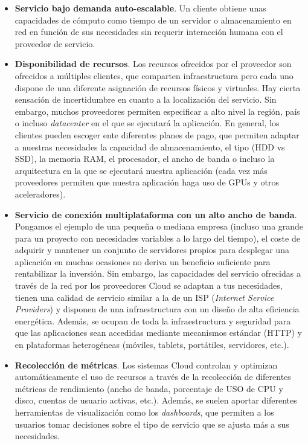 \begin{itemize}
\item \textbf{Servicio bajo demanda auto-escalable}. Un cliente obtiene unas capacidades de cómputo como tiempo de un servidor o almacenamiento en red en función de sus necesidades sin requerir interacción humana con el proveedor de servicio.
\item \textbf{Disponibilidad de recursos}. Los recursos ofrecidos por el proveedor son ofrecidos a múltiples clientes, que comparten infraestructura pero cada uno dispone de una diferente asignación de recursos físicos y virtuales. Hay cierta sensación de incertidumbre en cuanto a la localización del servicio. Sin embargo, muchos proveedores permiten especificar a alto nivel la región, país o incluso \textit{datacenter} en el que se ejecutará la aplicación. En general, los clientes pueden escoger ente diferentes planes de pago, que permiten adaptar a nuestras necesidades la capacidad de almacenamiento, el tipo (HDD vs SSD), la memoria RAM, el procesador, el ancho de banda o incluso la arquitectura en la que se ejecutará nuestra aplicación (cada vez más proveedores permiten que nuestra aplicación haga uso de GPUs y otros aceleradores).
\item \textbf{Servicio de conexión multiplataforma con un alto ancho de banda}. Pongamos el ejemplo de una pequeña o mediana empresa (incluso una grande para un proyecto con necesidades variables a lo largo del tiempo), el coste de adquirir y mantener un conjunto de servidores propios para desplegar una aplicación en muchas ocasiones no deriva un beneficio suficiente para rentabilizar la inversión. Sin embargo, las capacidades del servicio ofrecidas a través de la red por los proveedores Cloud se adaptan a tus necesidades, tienen una calidad de servicio similar a la de un ISP (\textit{Internet Service Providers}) y disponen de una infraestructura con un diseño de alta eficiencia energética. Además, se ocupan de toda la infraestructura y seguridad para que las aplicaciones sean accedidas mediante mecanismos estándar (HTTP) y en plataformas heterogéneas (móviles, tablets, portátiles, servidores, etc.).
\item \textbf{Recolección de métricas}. Los sistemas Cloud controlan y optimizan automáticamente el uso de recursos a través de la recolección de diferentes métricas de rendimiento (ancho de banda, porcentaje de USO de CPU y disco, cuentas de usuario activas, etc.). Además, se suelen aportar diferentes herramientas de visualización como los \textit{dashboards}, que permiten a los usuarios tomar decisiones sobre el tipo de servicio que se ajusta más a sus necesidades.
\end{itemize}

